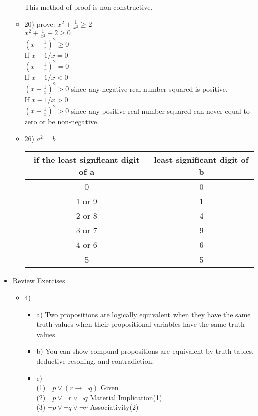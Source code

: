 \documentclass{article}
\begin{document}
\begin{itemize}
\begin{itemize}
      This method of proof is non-constructive.
    \item
      20)
      prove: $x^{2}+\frac{1}{x^{2}}\ge 2$\\
      $x^{2} + \frac{1}{x^{2}}-2\ge 0$\\
      $(x-\frac{1}{x})^{2}\ge 0$\\
      If $x-1/x=0$\\
      \hspace*{2em} $(x-\frac{1}{x})^{2}=0$\\
      If $x-1/x<0$\\
      \hspace*{2em} $(x-\frac{1}{x})^{2}>0$\hfill \hspace*{2em} since any negative real number squared is positive.\\
      If $x-1/x>0$\\
      \hspace*{2em} $(x-\frac{1}{x})^{2}>0$\hfill \hspace*{2em} since any positive real number squared can never equal to zero or be non-negative.\\
    \item
      26) $a^{2}=b$\\
      \begin{tabular}{c|c}
      if the least signficant digit of a & least significant digit of b \\ \hline
      0 & 0 \\
      1 or 9 & 1 \\
      2 or 8 & 4 \\
      3 or 7 & 9 \\
      4 or 6 & 6 \\
      5 & 5 \\
      \end{tabular}
  \end{itemize}
  \item
    Review Exercises
  \begin{itemize}
    \item
      4)
      \begin{itemize}
        \item a)
          Two propositions are logically equivalent when they have the same truth values when their propositional variables have the same truth values.
        \item b)
          You can show compund propositions are equivalent by truth tables, deductive resoning, and contradiction.
        \item c) \\
        (1) $\lnot p \lor (r \to \lnot q)$ \hfill Given\\
        (2) $\lnot p \lor \lnot r \lor \lnot q$ \hfill Material Implication(1)\\
        (3) $\lnot p \lor \lnot q \lor \lnot r$ \hfill Associativity(2)\\


\end{itemize}
\end{itemize}
\end{itemize}
\end{document}
